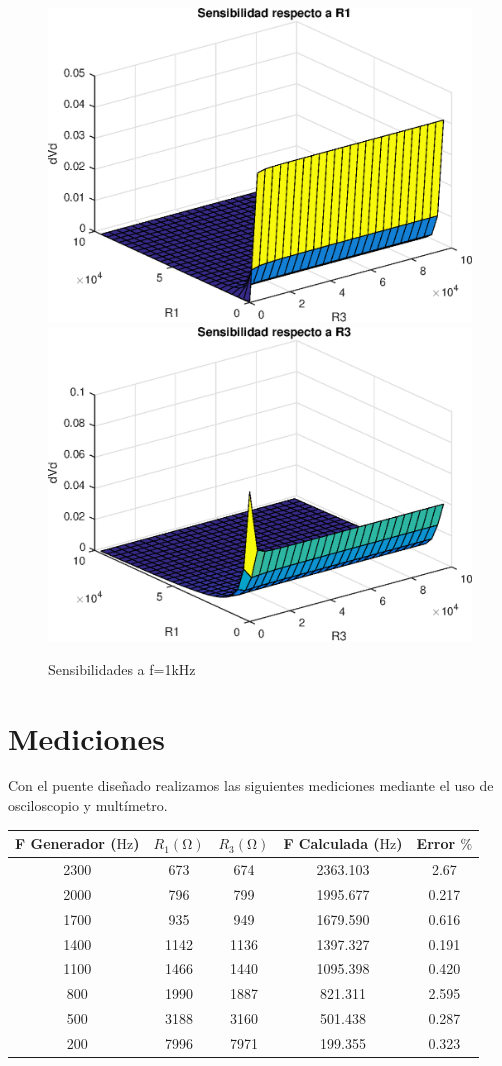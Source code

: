 \begin{figure}[ht]
    \begin{center}
        \includegraphics[width=0.45\linewidth]{MATLAB/ej2dVd1.eps}
        \includegraphics[width=0.45\linewidth]{MATLAB/ej2dVd3.eps}
        \caption{Sensibilidades a f=1kHz}
        \label{fig:ej2dVd}
    \end{center}
\end{figure}

\section{Mediciones}
Con el puente diseñado realizamos las siguientes mediciones mediante el uso de osciloscopio
y multímetro.

\begin{table}[ht]
    \begin{center}
        \begin{tabular}{|c|c|c|c|c|}
            \toprule
            F Generador ($\si{\hertz}$)& $R_1 (\si{\ohm})$& $R_3 (\si{\ohm})$& F Calculada ($\si{\hertz}$)& Error $\%$ \\
            \midrule
            2300&673&674&2363.103&2.67\\
            2000&796&799&1995.677&0.217\\
            1700&935&949&1679.590&0.616\\
            1400&1142&1136&1397.327&0.191\\
            1100&1466&1440&1095.398&0.420\\
            800&1990&1887&821.311&2.595\\
            500&3188&3160&501.438&0.287\\
            200&7996&7971&199.355&0.323\\
            \bottomrule
        \end{tabular}
    \end{center}
\end{table}

